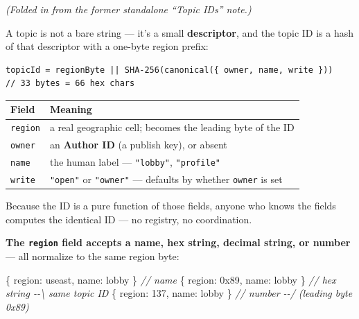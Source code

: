 \documentclass[
  nobib]{tufte-handout}
\newenvironment{Shaded}{}{}
\newcommand{\CommentTok}[1]{\textcolor[rgb]{0.38,0.63,0.69}{\textit{#1}}}
\newcommand{\DataTypeTok}[1]{\textcolor[rgb]{0.56,0.13,0.00}{#1}}
\newcommand{\DecValTok}[1]{\textcolor[rgb]{0.25,0.63,0.44}{#1}}
\newcommand{\NormalTok}[1]{#1}
\newcommand{\OperatorTok}[1]{\textcolor[rgb]{0.40,0.40,0.40}{#1}}
\newcommand{\StringTok}[1]{\textcolor[rgb]{0.25,0.44,0.63}{#1}}
\newcounter{none} %
\begin{document}
\emph{(Folded in from the former standalone ``Topic IDs'' note.)}

A topic is not a bare string --- it's a small \textbf{descriptor}, and
the topic ID is a hash of that descriptor with a one-byte region prefix:

\begin{verbatim}
topicId = regionByte || SHA-256(canonical({ owner, name, write }))   // 33 bytes = 66 hex chars
\end{verbatim}

{\def\LTcaptype{none} %
\begin{longtable}[]{@{}
  >{\raggedright\arraybackslash}p{}
  >{\raggedright\arraybackslash}p{}@{}}
\toprule\noalign{}
\begin{minipage}[b]{\linewidth}\raggedright
Field
\end{minipage} & \begin{minipage}[b]{\linewidth}\raggedright
Meaning
\end{minipage} \\
\midrule\noalign{}
\endhead
\bottomrule\noalign{}
\endlastfoot
\texttt{region} & a real geographic cell; becomes the leading byte of
the ID \\
\texttt{owner} & an \textbf{Author ID} (a publish key), or absent \\
\texttt{name} & the human label --- \texttt{"lobby"},
\texttt{"profile"} \\
\texttt{write} & \texttt{"open"} or \texttt{"owner"} --- defaults by
whether \texttt{owner} is set \\
\end{longtable}
}

Because the ID is a pure function of those fields, anyone who knows the
fields computes the identical ID --- no registry, no coordination.

\textbf{The \texttt{region} field accepts a name, hex string, decimal
string, or number} --- all normalize to the same region byte:

\begin{Shaded}
\begin{Highlighting}[]
\NormalTok{\{ }\DataTypeTok{region}\OperatorTok{:} \StringTok{\textquotesingle{}useast\textquotesingle{}}\OperatorTok{,} \DataTypeTok{name}\OperatorTok{:} \StringTok{\textquotesingle{}lobby\textquotesingle{}}\NormalTok{ \}   }\CommentTok{// name}
\NormalTok{\{ }\DataTypeTok{region}\OperatorTok{:} \StringTok{\textquotesingle{}0x89\textquotesingle{}}\OperatorTok{,}   \DataTypeTok{name}\OperatorTok{:} \StringTok{\textquotesingle{}lobby\textquotesingle{}}\NormalTok{ \}   }\CommentTok{// hex string   {-}{-}\textbackslash{}  same topic ID}
\NormalTok{\{ }\DataTypeTok{region}\OperatorTok{:} \DecValTok{137}\OperatorTok{,}      \DataTypeTok{name}\OperatorTok{:} \StringTok{\textquotesingle{}lobby\textquotesingle{}}\NormalTok{ \}   }\CommentTok{// number       {-}{-}/  (leading byte 0x89)}
\end{Highlighting}
\end{Shaded}
\end{document}
